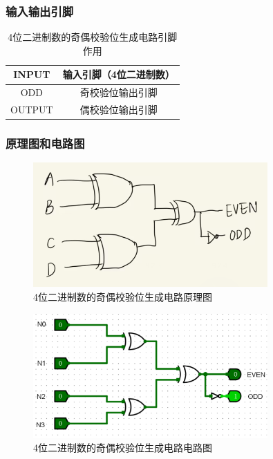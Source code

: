 \documentclass{article}
\begin{document}
    \subsubsection{输入输出引脚}
    \begin{table}[H]
        \centering
        \begin{tabular}{|c|c|}
            \hline
            INPUT & 输入引脚（4位二进制数） \\ \hline
            ODD & 奇校验位输出引脚 \\ \hline 
            OUTPUT & 偶校验位输出引脚 \\ \hline
        \end{tabular}
        \caption{4位二进制数的奇偶校验位生成电路引脚作用}
        \end{table}
    \subsubsection{原理图和电路图}

    \begin{figure}[H]
    \centering
    \includegraphics[width=0.8\textwidth]{10.3.1.png}
    \caption{4位二进制数的奇偶校验位生成电路原理图}
    \end{figure}

    \begin{figure}[H]
        \centering
        \includegraphics[width=0.8\textwidth]{10.3.2.png}
        \caption{4位二进制数的奇偶校验位生成电路电路图}
        \end{figure}
\end{document}
